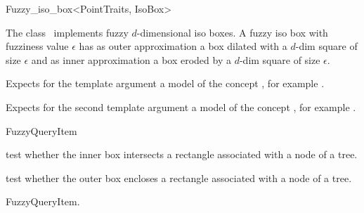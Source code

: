 

\begin{ccRefClass}{Fuzzy_iso_box<PointTraits, IsoBox>}  %


\ccDefinition
  
The class \ccRefName\ implements fuzzy $d$-dimensional iso boxes.
A fuzzy iso box with fuzziness value $\epsilon$ has
as outer approximation a box  dilated with a $d$-dim square of size $\epsilon$ and
as inner approximation a box eroded by a $d$-dim square of size $\epsilon$. 


\ccParameters
Expects for the template argument a model of the concept
, for example .

Expects for the second template argument  a model 
of the concept , for example .
 
\ccIsModel

FuzzyQueryItem

\ccTypes


\ccCreation
{}  %


\ccOperations


{test whether the inner box intersects a rectangle
associated with a node of a tree.}

{test whether the outer box encloses a rectangle
associated with a node of a tree.}

\ccSeeAlso

FuzzyQueryItem.

\end{ccRefClass}


